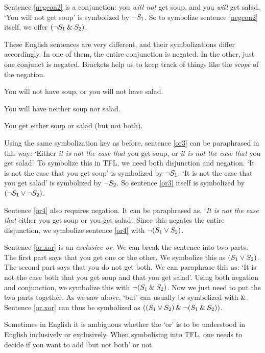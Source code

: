 Sentence \ref{negcon2} is a conjunction: you \emph{will not} get soup, and you \emph{will} get salad. `You will not get soup' is symbolized by $\neg S_1$. So to symbolize sentence \ref{negcon2} itself, we offer $(\neg S_1 \mathbin{\&} S_2)$.

These English sentences are very different, and their symbolizations differ accordingly. In one of them, the entire conjunction is negated. In the other, just one conjunct is negated. Brackets help us to keep track of things like the \emph{scope} of the negation.
%




	\begin{earg}
		\item[\ex{or3}] You will not have soup, or you will not have salad.
		\item[\ex{or4}] You will have neither soup nor salad.
		\item[\ex{or.xor}] You get either soup or salad (but not both).
	\end{earg}
Using the same symbolization key as before, sentence \ref{or3} can be paraphrased in this way: `Either \emph{it is not the case that} you get soup, or \emph{it is not the case that} you get salad'. To symbolize this in TFL, we need both disjunction and negation. `It is not the case that you get soup' is symbolized by $\neg S_1$. `It is not the case that you get salad' is symbolized by $\neg S_2$. So sentence \ref{or3} itself is symbolized by $(\neg S_1 \vee \neg S_2)$.

Sentence \ref{or4} also requires negation. It can be paraphrased as, `\emph{It is not the case that} either you get soup or you get salad'. Since this negates the entire disjunction, we symbolize sentence \ref{or4} with $\neg (S_1 \vee S_2)$.

Sentence \ref{or.xor} is an \emph{exclusive or}. We can break the sentence into two parts. The first part says that you get one or the other. We symbolize this as $(S_1 \vee S_2)$. The second part says that you do not get both. We can paraphrase this as: `It is not the case both that you get soup and that you get salad'. Using both negation and conjunction, we symbolize this with $\neg(S_1 \mathbin{\&} S_2)$. Now we just need to put the two parts together. As we saw above, `but' can usually be symbolized with $\mathbin{\&}$. Sentence \ref{or.xor} can thus be symbolized as $((S_1 \vee S_2) \mathbin{\&} \neg(S_1 \mathbin{\&} S_2))$.

Sometimes in English it is ambiguous whether the `or' is to be understood in English inclusively or exclusively.
When symbolising into TFL, one needs to decide if you want to add `but not both' or not.

